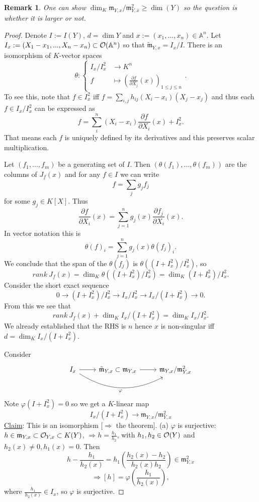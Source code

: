 \documentclass[11pt]{article}
\newtheorem{rmk}[thm]{Remark}
\newcommand{\affn}{\mathbb A}
\newcommand{\scm}{{\mathfrak m}}
\newcommand{\calo}{{\cal O}}
\newcommand{\pd}{\partial}
\newcommand{\Lrta}{\Longrightarrow}
\newcommand{\lrta}{\longrightarrow}
\begin{document}
\begin{rmk}
	One can show $\dim_K\scm_{Y,x}/\scm_{Y,x}^2\geq \dim (Y)$ so the question is whether it is larger or not. 
\end{rmk}

\begin{proof}
	Denote $I:=I(Y)$, $d= \dim Y$ and  $x:=(x_1,...,x_n)\in\affn^n$.
	Let $I_x:=(X_1-x_1,...,X_n-x_n)\subset \calo(\affn^n)$ so that $\tilde{\scm}_{Y,x}=I_x/I$.
	There  is an isomorphism of $K$-vector spaces
	$$
	\theta:\left\{\begin{aligned}
	I_x/I_x^2&\lrta K^n\\
	f&\longmapsto \left(\frac{\pd f}{\pd X_j}(x)\right)_{1\leq j\leq n}
	\end{aligned}\right. .
	$$
	To see this, note that $f\in I^2_x$ iff $f=\sum_{i,j}h_{ij}(X_i-x_i)(X_j-x_j)$ and thus each $f \in I_x/I_x^2$ can be expressed as
	$$
	f=\sum_{i}^n(X_i-x_i)\frac{\pd f}{\pd X_i}(x)+I_x^2.
	$$
	That means each $f$ is uniquely defined by its derivatives and this preserves scalar multiplication.
	
	Let $(f_1,...,f_m)$ be a generating set of $I$. Then $(\theta(f_1),...,\theta(f_m))$ are the columns of $J_{\underline{f}}(x)$ and for any $f\in I$ we can write
	$$
	f=\sum_j g_j f_j
	$$
	for some $g_j \in K[X]$. Thus
	$$
	\frac{\pd f}{\pd X_i}(x)=\sum^n_{j=1} g_j(x)\frac{\pd f_j}{\pd X_i}(x).
	$$
	In vector notation this is
	$$
	\theta(f)_i=\sum^n_{j=1} g_j(x) \theta(f_j)_i .
	$$
	We conclude that the span of the $\theta(f_j)$ is $\theta((I+I_x^2)/I_x^2)$, so 
	$$
	rank\  J_{\underline{f}}(x)=\dim_K\theta((I+I_x^2)/I_x^2) = \dim_K (I+I_x^2)/I_x^2 .
	$$
	Consider the short exact sequence
	$$
	0 \lrta (I +I_x^2)/I_x^2  \lrta I_x/I_x^2 \lrta I_x/(I+I_x^2)  \lrta 0 .
	$$
	From this we see that 
	$$ rank \ J_{\underline{f}}(x) + \dim_K  I_x/(I+I_x^2) = \dim_K I_x/I_x^2 .$$  
	We already established that the RHS is $n$ hence $x$ is non-singular iff 
	$d=\dim_K I_x/(I+I_x^2)$. 
	
	Consider 
	$$
	\begin{tikzcd}
	I_x \arrow[r] \arrow[rr, "\varphi"', bend right] & \tilde{\scm}_{Y,x}\subset \scm_{Y,x} \arrow[r] & \scm_{Y,x}/\scm_{Y,x}^2
	\end{tikzcd}
	$$
	Note $\varphi(I+I_x^2)=0$ so we get a $K$-linear map 
	$$
	I_x/(I+I_x^2)\lrta \scm_{Y,x}/\scm_{Y,x}^2
	$$
	\underline{Claim}: This is an isomorphism $[\Lrta$ the theorem].  
	(a) $\varphi$ is surjective: 
	$h\in \scm_{Y,x}\subset \calo_{Y,x}\subset K(Y)$, $\Lrta h=\frac{h_1}{h_2}$, with $h_1, h_2\in\calo(Y)$ and $h_2(x)\neq 0, h_1(x)=0$. Then $$
	h-\frac{h_1}{h_2(x)}=h_1\left(\frac{h_2(x)-h_2}{h_2(x)h_2}\right)\in\scm_{Y,x}^2$$
	$$
	\Lrta [h]=\varphi\left(\frac{h_1}{h_2(x)}\right),
	$$
	where $\frac{h_1}{h_2(x)}\in I_x$, so $\varphi$ is surjective.
	

\end{proof}
\end{document}
